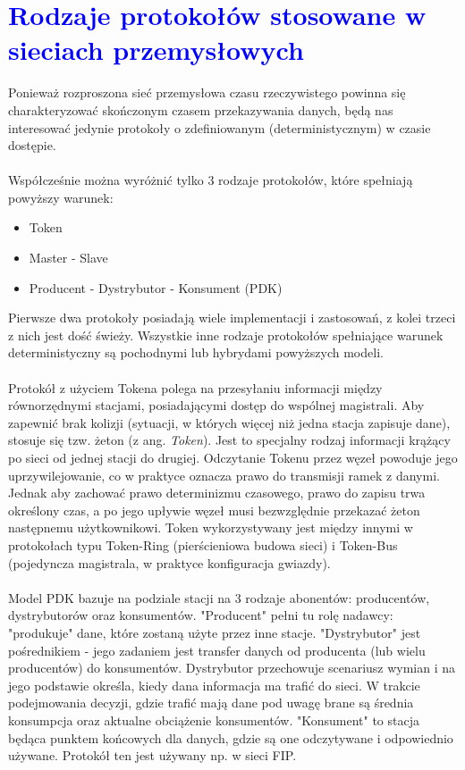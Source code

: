 \documentclass[a4paper,twoside]{article}
\begin{document}
\section{\textcolor{blue}{Rodzaje protokołów stosowane w sieciach przemysłowych}}

Ponieważ rozproszona sieć przemysłowa czasu rzeczywistego powinna się charakteryzować skończonym czasem przekazywania danych, będą nas interesować jedynie protokoły o zdefiniowanym (deterministycznym) w czasie dostępie. \\\\
Współcześnie można wyróżnić tylko 3 rodzaje protokołów, które spełniają powyższy warunek:
\begin{itemize}
	\item Token
	\item Master - Slave
	\item Producent - Dystrybutor - Konsument (PDK)
\end{itemize}
Pierwsze dwa protokoły posiadają wiele implementacji i zastosowań, z kolei trzeci z nich jest dość świeży. Wszystkie inne rodzaje protokołów spełniające warunek deterministyczny są pochodnymi lub hybrydami powyższych modeli. \\\\
Protokół z użyciem Tokena polega na przesyłaniu informacji między równorzędnymi stacjami, posiadającymi dostęp do wspólnej magistrali. Aby zapewnić brak kolizji (sytuacji, w których więcej niż jedna stacja zapisuje dane), stosuje się tzw. żeton (z ang. \textit{Token}). Jest to specjalny rodzaj informacji krążący po sieci od jednej stacji do drugiej. Odczytanie Tokenu przez węzeł powoduje jego uprzywilejowanie, co w praktyce oznacza prawo do transmisji ramek z danymi. Jednak aby zachować prawo determinizmu czasowego, prawo do zapisu trwa określony czas, a po jego upływie węzeł musi bezwzględnie przekazać żeton następnemu użytkownikowi. Token wykorzystywany jest między innymi w protokołach typu Token-Ring (pierścieniowa budowa sieci) i Token-Bus (pojedyncza magistrala, w praktyce konfiguracja gwiazdy). \\\\
Model PDK bazuje na podziale stacji na 3 rodzaje abonentów: producentów, dystrybutorów oraz konsumentów. "Producent" pełni tu rolę nadawcy: "produkuje" dane, które zostaną użyte przez inne stacje. "Dystrybutor" jest pośrednikiem - jego zadaniem jest transfer danych od producenta (lub wielu producentów) do konsumentów. Dystrybutor przechowuje scenariusz wymian i na jego podstawie określa, kiedy dana informacja ma trafić do sieci. W trakcie podejmowania decyzji, gdzie trafić mają dane pod uwagę brane są średnia konsumpcja oraz aktualne obciążenie konsumentów. "Konsument" to stacja będąca punktem końcowych dla danych, gdzie są one odczytywane i odpowiednio używane. Protokół ten jest używany np. w sieci FIP.
\end{document}
